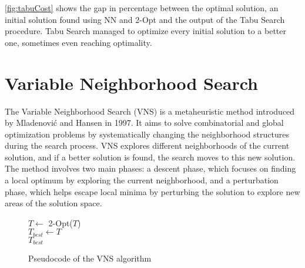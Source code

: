 \figurename{ \ref{fig:tabuCost}} shows the gap in percentage between the optimal solution, an initial solution found using NN and 2-Opt and the output of the Tabu Search procedure.
Tabu Search managed to optimize every initial solution to a better one, sometimes even reaching optimality.



\newpage
\section{Variable Neighborhood Search}

The Variable Neighborhood Search (VNS) is a metaheuristic method introduced by Mladenović and Hansen in 1997\cite{vnsWikipedia}.
It aims to solve combinatorial and global optimization problems by systematically changing the neighborhood structures during the search process.
VNS explores different neighborhoods of the current solution, and if a better solution is found, the search moves to this new solution.
The method involves two main phases: a descent phase, which focuses on finding a local optimum by exploring the current neighborhood, and a perturbation phase, which helps escape local minima by perturbing the solution to explore new areas of the solution space.

\begin{figure}[htbp]
    \begin{algorithm}[H]
        \BlankLine
        $T \gets$ 2-Opt($T$)\\
        $T_{best} \gets T$\\
        \Return $T_{best}$
    \end{algorithm}
    \caption{Pseudocode of the VNS algorithm} \label{fig:vnsPseudocode}
\end{figure}

